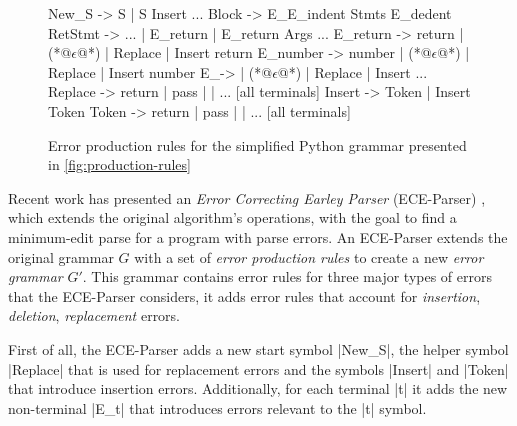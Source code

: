 \begin{figure}[t]
\begin{ecode}
New_S     -> S | S Insert
...
Block     -> E_\n E_indent Stmts E_dedent
RetStmt   -> ... | E_return | E_return Args
...
E_return  -> return | (*@$\epsilon$@*) | Replace | Insert return
E_number  -> number | (*@$\epsilon$@*) | Replace | Insert number
E_\n      -> \n | (*@$\epsilon$@*) | Replace | Insert \n
...
Replace   -> return | pass | \n | ... [all terminals]
Insert    -> Token | Insert Token
Token     -> return | pass | \n | ... [all terminals]
\end{ecode}
\caption{Error production rules for the simplified Python grammar presented in
\autoref{fig:production-rules}}
\label{fig:error-rules}
\end{figure}

 Recent work has presented an \emph{Error
Correcting Earley Parser} (ECE-Parser) \citep{Aho_1972}, which extends the
original algorithm's operations, with the goal to find a minimum-edit parse for
a program with parse errors. An ECE-Parser extends the original grammar $G$ with
a set of \emph{error production rules} to create a new \emph{error grammar}
$G'$. This grammar contains error rules for three major types of errors that the
ECE-Parser considers, \ie it adds error rules that account for \emph{insertion},
\emph{deletion}, \emph{replacement} errors.

First of all, the ECE-Parser adds a new start symbol |New_S|, the helper symbol
|Replace| that is used for replacement errors and the symbols |Insert| and
|Token| that introduce insertion errors. Additionally, for each terminal |t| it
adds the new non-terminal |E_t| that introduces errors relevant to the |t|
symbol.

